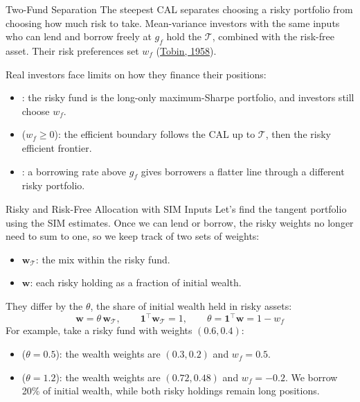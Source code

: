 \documentclass[aspectratio=169,11pt]{beamer}
\newcommand{\bw}{\mathbf{w}}
\newcommand{\bone}{\mathbf{1}}
\newcommand{\Tan}{\mathcal{T}}
\begin{document}
\begin{frame}{Two-Fund Separation}
  The steepest CAL separates choosing a risky portfolio from choosing how much
  risk to take. Mean-variance investors with the same inputs who can lend and
  borrow freely at $g_f$ hold the  $\Tan$, combined with the risk-free asset.
  Their risk preferences set $w_f$
  (\href{https://doi.org/10.2307/2296205}{Tobin, 1958}).

  \vspace{0.6em}
  Real investors face limits on how they finance their positions:
  \begin{itemize}\setlength{\itemsep}{0.5em}
    \item {}: the risky fund is the long-only
      maximum-Sharpe portfolio, and investors still choose $w_f$.
    \item {} ($w_f\ge0$): the efficient boundary follows the
      CAL up to $\Tan$, then the risky efficient frontier.
    \item {}: a borrowing rate above $g_f$ gives
      borrowers a flatter line through a different risky portfolio.
  \end{itemize}
\end{frame}

\begin{frame}{Risky and Risk-Free Allocation with SIM Inputs}
  Let's find the  tangent portfolio using the SIM estimates. Once we can
  lend or borrow, the risky weights no longer need to sum to one, so we keep track of
  two sets of weights:
  \begin{itemize}\setlength{\itemsep}{0.4em}
    \item {} $\bw_{\Tan}$: the mix within the risky fund.
    \item {} $\bw$: each risky holding as a fraction of initial wealth.
  \end{itemize}
  They differ by the  $\theta$, the share of initial wealth held in risky assets:
  \[
    \boxed{\bw=\theta\,\bw_{\Tan},\qquad\bone^{\top}\bw_{\Tan}=1,\qquad
    \theta=\bone^{\top}\bw=1-w_f}
  \]
  For example, take a risky fund with weights $(0.6,0.4)$:
  \begin{itemize}\setlength{\itemsep}{0.4em}
    \item {} ($\theta=0.5$): the wealth weights are $(0.3,0.2)$ and $w_f=0.5$.
    \item {} ($\theta=1.2$): the wealth weights are $(0.72,0.48)$ and $w_f=-0.2$.
      We borrow 20\% of initial wealth, while both risky holdings remain long positions.
  \end{itemize}
\end{frame}
\end{document}
